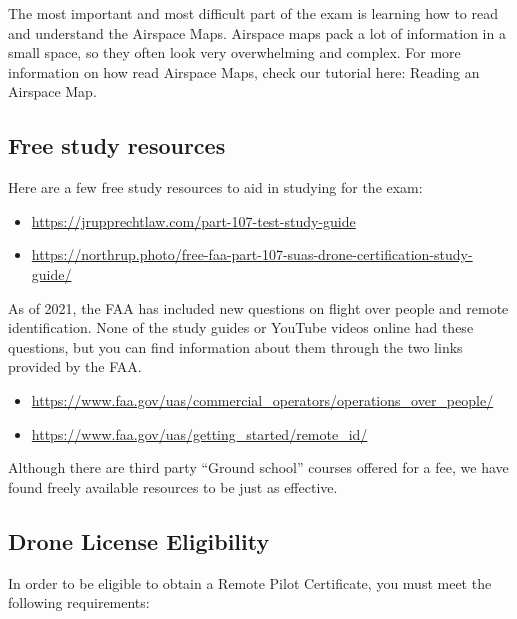 \documentclass[
  12pt,
]{book}
\providecommand{\tightlist}{%
  \setlength{\itemsep}{0pt}\setlength{\parskip}{0pt}}
\newenvironment{notebox}{
  \definecolor{shadecolor}{gray}{.8}  %
  \color{black}
  \begin{shaded}}
 {\end{shaded}}
\begin{document}
The most important and most difficult part of the exam is learning how to read and understand the Airspace Maps. Airspace maps pack a lot of information in a small space, so they often look very overwhelming and complex. For more information on how read Airspace Maps, check our tutorial here: Reading an Airspace Map.

\hypertarget{free-study-resources}{%
\subsection{Free study resources}\label{free-study-resources}}

Here are a few free study resources to aid in studying for the exam:

\begin{itemize}
\tightlist
\item
  \url{https://jrupprechtlaw.com/part-107-test-study-guide}
\item
  \url{https://northrup.photo/free-faa-part-107-suas-drone-certification-study-guide/}
\end{itemize}

As of 2021, the FAA has included new questions on flight over people and remote identification. None of the study guides or YouTube videos online had these questions, but you can find information about them through the two links provided by the FAA.

\begin{itemize}
\tightlist
\item
  \url{https://www.faa.gov/uas/commercial_operators/operations_over_people/}
\item
  \url{https://www.faa.gov/uas/getting_started/remote_id/}
\end{itemize}

\begin{notebox}
Although there are third party ``Ground school'' courses offered for a fee, we have found freely available resources to be just as effective.

\end{notebox}

\hypertarget{drone-license-eligibility}{%
\subsection{Drone License Eligibility}\label{drone-license-eligibility}}

In order to be eligible to obtain a Remote Pilot Certificate, you must meet the following requirements:
\end{document}
